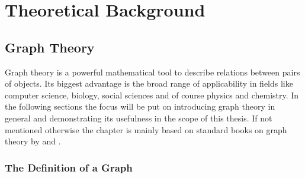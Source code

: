 
\part{Theoretical Background}
\label{sec:theory}

\chapter{Graph Theory}
\label{sec:graphtheory}

Graph theory is a powerful mathematical tool to describe relations between pairs
of objects. Its biggest advantage is the broad range of applicability in fields
like computer science, biology, social sciences and of course physics and
chemistry. In the following sections the focus will be put on introducing graph
theory in general and demonstrating its usefulness in the scope of this thesis.
If not mentioned otherwise the chapter is mainly based on standard books on
graph theory by
\citeauthor{West_Introductiongraphtheory_2001}\autocite{West_Introductiongraphtheory_2001}
and
\citeauthor{Balakrishnan_Schaumoutlinetheory_1997}\autocite{Balakrishnan_Schaumoutlinetheory_1997}.

\section{The Definition of a Graph}
\label{sec:DefinitionGraph}

